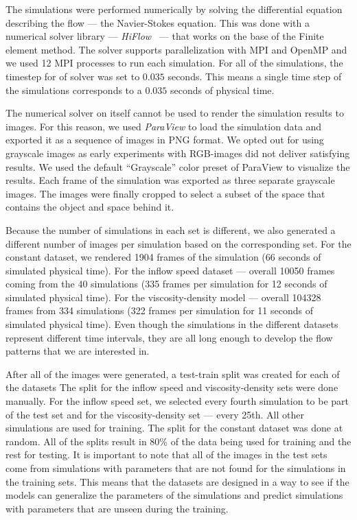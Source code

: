 \documentclass{llncs}
\begin{document}
The simulations were performed numerically by solving the differential equation describing the flow --- the Navier-Stokes equation. This was done with a numerical solver library --- \emph{HiFlow}~\cite{gawlok2017} ---  that works on the base of the Finite element method. The solver supports parallelization with MPI and OpenMP and we used 12 MPI processes to run each simulation. For all of the simulations, the timestep for of solver was set to $0.035$ seconds. This means a single time step of the simulations corresponds to a $0.035$ seconds of physical time.

The numerical solver on itself cannot be used to render the simulation results to images. For this reason, we used \emph{ParaView} to load the simulation data and exported it as a sequence of images in PNG format. We opted out for using grayscale images as early experiments with RGB-images did not deliver satisfying results. We used the default ``Grayscale'' color preset of ParaView to visualize the results. Each frame of the simulation was exported as three separate grayscale images. The images were finally cropped to select a subset of the space that contains the object and space behind it.

Because the number of simulations in each set is different, we also generated a different number of images per simulation based on the corresponding set. For the constant dataset, we rendered 1904 frames of the simulation (66 seconds of simulated physical time). For the inflow speed dataset --- overall 10050 frames coming from the 40 simulations (335 frames per simulation for 12 seconds of simulated physical time). For the viscosity-density model --- overall 104328 frames from 334 simulations (322 frames per simulation for 11 seconds of simulated physical time). Even though the simulations in the different datasets represent different time intervals, they are all long enough to develop the flow patterns that we are interested in.

After all of the images were generated, a test-train split was created for each of the datasets The split for the inflow speed and viscosity-density sets were done manually. For the inflow speed set, we selected every fourth simulation to be part of the test set and for the viscosity-density set --- every 25th. All other simulations are used for training. The split for the constant dataset was done at random. All of the splits result in  80\% of the data being used for training and the rest for testing. It is important to note that all of the images in the test sets come from simulations with parameters that are not found for the simulations in the training sets. This means that the datasets are designed in a way to see if the models can generalize the parameters of the simulations and predict simulations with parameters that are unseen during the training.
\end{document}
